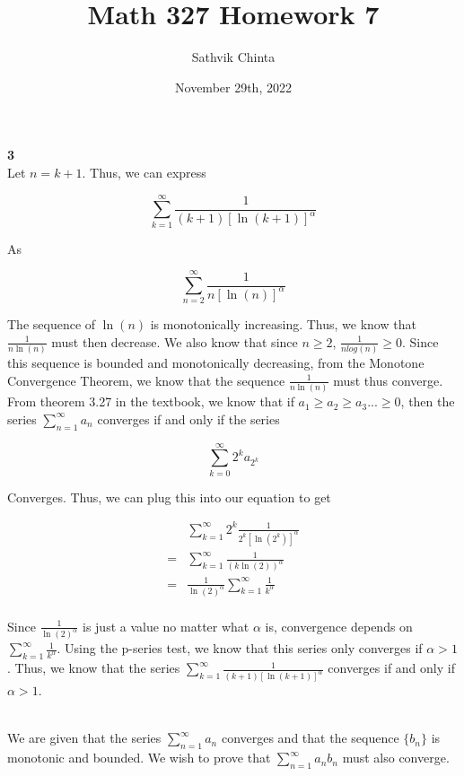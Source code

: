\documentclass[addpoints]{exam}
\title{Math 327 Homework 7}
\author{Sathvik Chinta}
\date{November 29th, 2022}
\begin{document}
\maketitle

\begin{questions}
\question \textbf{3} \\

Let $n = k + 1$. Thus, we can express

\[\sum_{k = 1}^{\infty} \frac{1}{(k+1)[\ln(k+1)]^\alpha}\]

As 

\[\sum_{n = 2}^{\infty} \frac{1}{n[\ln(n)]^\alpha}\]

The sequence of $\ln(n)$ is monotonically increasing. Thus, we know that $\frac{1}{n\ln(n)}$ must then decrease. We also know that since $n \geq 2$, $\frac{1}{nlog(n)} \geq 0$. Since this sequence is bounded and monotonically decreasing, 
from the Monotone Convergence Theorem, we know that the sequence $\frac{1}{n\ln(n)}$ must thus converge. From theorem 3.27 in the textbook, we know that if $a_1 \geq a_2 \geq a_3... \geq 0$, then the series 
$\sum_{n = 1}^{\infty} a_n$ converges if and only if the series 

\[\sum_{k = 0}^{\infty} 2^k a_{2^k}\]

Converges. Thus, we can plug this into our equation to get

\begin{align*}
    &\sum_{k = 1}^{\infty} 2^k \frac{1}{2^k[\ln(2^k)]^\alpha} \\
    = &\sum_{k = 1}^{\infty} \frac{1}{(k \ln(2))^\alpha} \\
    = &\frac{1}{\ln(2)^\alpha} \sum_{k = 1}^{\infty} \frac{1}{k^\alpha} \\
\end{align*}

Since $\frac{1}{\ln(2)^\alpha}$ is just a value no matter what $\alpha$ is, convergence depends on 
$\sum_{k = 1}^{\infty} \frac{1}{k^\alpha}$. Using the p-series test, we know that this series only converges if
$\alpha > 1$. Thus, we know that the series $\sum_{k = 1}^{\infty} \frac{1}{(k+1)[\ln(k+1)]^\alpha}$ converges if and only if $\alpha > 1$.

\question \\

We are given that the series $\sum_{n = 1}^{\infty} a_n$ converges and that the sequence $\{b_n\}$ is monotonic and bounded. 
We wish to prove that $\sum_{n = 1}^{\infty} a_n b_n$ must also converge. 


\end{questions}
\end{document}
